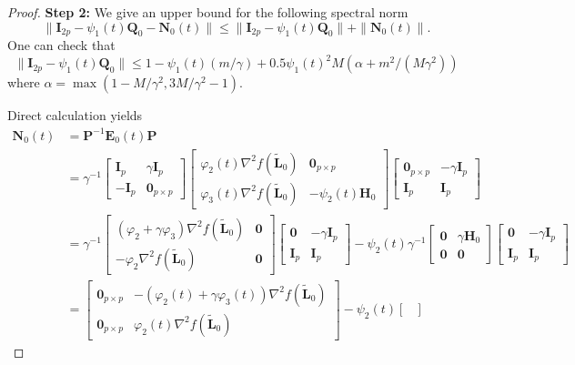 \documentclass[a4paper,bej,preprint,reqno]{imsart}
\newcommand\bfE{\mathbf E}
\newcommand\bfP{\mathbf P}
\newcommand\bfQ{\mathbf Q}
\newcommand\bfN{\mathbf N}
\newcommand\bfH{\mathbf H}
\newcommand\bL{\boldsymbol L}
\newcommand\bfI{\mathbf I}
\def\Tilde{\widetilde}
\begin{document}
\begin{proof}
\textbf{Step 2:} We give an upper bound for the following spectral norm
$$
\|\bfI_{2p}-\psi_1(t) \bfQ_0- \bfN_0(t)\|\le \|\bfI_{2p}-\psi_1(t) \bfQ_0\|+\|\bfN_0(t)\|.
$$
One can check that
$$\|\bfI_{2p}-\psi_1(t)\bfQ_0\|\le1-\psi_1(t)(m/\gamma)+0.5\psi_1(t)^2M(\alpha+m^2/(M\gamma^2))$$
where $\alpha=\max(1-M/\gamma^2,3M/\gamma^2-1)$.

Direct calculation yields
\begin{align}
\bfN_0(t)&=\bfP^{-1}\bfE_0(t)\bfP\\
&=
\gamma^{-1}\begin{bmatrix}
     \bfI_{p}  & \gamma \bfI_{p} \\
     - \bfI_{p} &  \mathbf 0_{p\times p}
\end{bmatrix}
\begin{bmatrix}
     \varphi_2(t)\nabla^2f(\Tilde{\bL}_0) & \mathbf 0_{p\times p}\\
     \varphi_3(t)\nabla^2f(\Tilde{\bL}_0) & -\psi_2(t)\bfH_0
\end{bmatrix}
\begin{bmatrix}
      \mathbf 0_{p\times p} & -\gamma \bfI_{p} \\
      \bfI_{p} & \bfI_{p}
\end{bmatrix}\\
&=
\gamma^{-1}
\begin{bmatrix}
     (\varphi_2+\gamma\varphi_3)\nabla^2f(\Tilde{\bL}_0) & \mathbf 0\\
     -\varphi_2\nabla^2f(\Tilde{\bL}_0) & \mathbf 0
\end{bmatrix}
\begin{bmatrix}
      \mathbf 0 & -\gamma \bfI_{p} \\
      \bfI_{p} & \bfI_{p}
\end{bmatrix}
-\psi_2(t)\gamma^{-1}
\begin{bmatrix}
     \mathbf 0 & \gamma \bfH_0\\
     \mathbf 0 & \mathbf 0
\end{bmatrix}
\begin{bmatrix}
      \mathbf 0 & -\gamma \bfI_{p} \\
      \bfI_{p} & \bfI_{p}
\end{bmatrix}\\
&=\begin{bmatrix}
      \mathbf 0_{p\times p} & -(\varphi_2(t)+\gamma\varphi_3(t))\nabla^2f
			(\Tilde{\bL}_0) \\
      \mathbf 0_{p\times p} & \varphi_2(t)\nabla^2f(\Tilde{\bL}_0)
\end{bmatrix}-\psi_2(t)\begin{bmatrix}

\end{bmatrix}
\end{align}
\end{proof}
\end{document}
